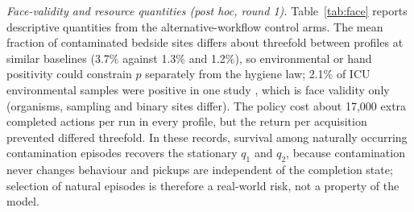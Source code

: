 \emph{Face-validity and resource quantities (post hoc, round 1).}
Table~\ref{tab:face} reports descriptive quantities from the alternative-workflow
control arms. The mean fraction of contaminated bedside sites differs about
threefold between profiles at similar baselines (3.7\% against 1.3\% and 1.2\%),
so environmental or hand positivity could constrain $p$ separately from the
hygiene law; 2.1\% of ICU environmental samples were positive in one study
\citep{wei2021}, which is face validity only (organisms, sampling and binary
sites differ). The policy cost about 17,000 extra completed actions per run in
every profile, but the return per acquisition prevented differed threefold. In
these records, survival among naturally occurring contamination episodes
recovers the stationary $q_1$ and $q_2$, because contamination never changes
behaviour and pickups are independent of the completion state; selection of
natural episodes is therefore a real-world risk, not a property of the model.

